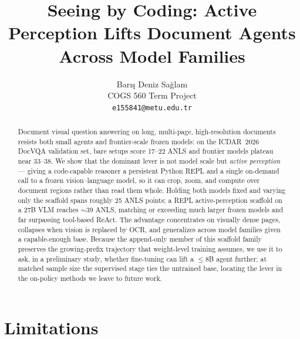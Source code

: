 \documentclass[11pt]{article}
\title{Seeing by Coding: Active Perception Lifts Document Agents Across Model Families}
\author{Bar\i{}\c{s} Deniz Sa\u{g}lam \\
  COGS 560 Term Project \\
  \texttt{e155841@metu.edu.tr} \\}
\begin{document}
\maketitle

\begin{abstract}
Document visual question answering on long, multi-page, high-resolution documents resists both small agents and frontier-scale frozen models: on the ICDAR~2026 DocVQA validation set, bare setups score 17--22 ANLS and frontier models plateau near 33--38. We show that the dominant lever is not model scale but \emph{active perception} --- giving a code-capable reasoner a persistent Python REPL and a single on-demand call to a frozen vision--language model, so it can crop, zoom, and compute over document regions rather than read them whole. Holding both models fixed and varying only the scaffold spans roughly 25 ANLS points; a REPL active-perception scaffold on a 27B VLM reaches $\sim$39 ANLS, matching or exceeding much larger frozen models and far surpassing tool-based ReAct. The advantage concentrates on visually dense pages, collapses when vision is replaced by OCR, and generalizes across model families given a capable-enough base. Because the append-only member of this scaffold family preserves the growing-prefix trajectory that weight-level training assumes, we use it to ask, in a preliminary study, whether fine-tuning can lift a $\leq$8B agent further; at matched sample size the supervised stage ties the untrained base, locating the lever in the on-policy methods we leave to future work.
\end{abstract}









\section*{Limitations}



\end{document}
